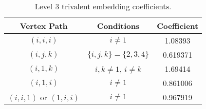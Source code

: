 \begin{table}
    \centering
    \begin{tabular}{|cc|c|} \hline
        Vertex Path & Conditions & Coefficient \\ \hline\hline
        $(i,i,i)$ &  $i\neq1$ & 1.08393 \\[10pt]  \hline
        $(i,j,k)$ &  $\{i,j,k\}=\{2,3,4\}$   & 0.619371 \\[10pt] \hline
        $(i,1,k)$ &  $i,k\neq 1$, $i\neq k$ & 1.69414 \\[10pt] \hline
        $(i,1,i)$ &  $i\neq 1$   & 0.861006 \\[10pt] \hline
        $(i,i,1)$ or $(1,i,i)$ &  $i\neq1$   & 0.967919 \\[10pt] \hline
    \end{tabular}
    \caption{Level 3 trivalent embedding coefficients.}
    \label{tab:lvl-3-triv-coefs}
\end{table}






